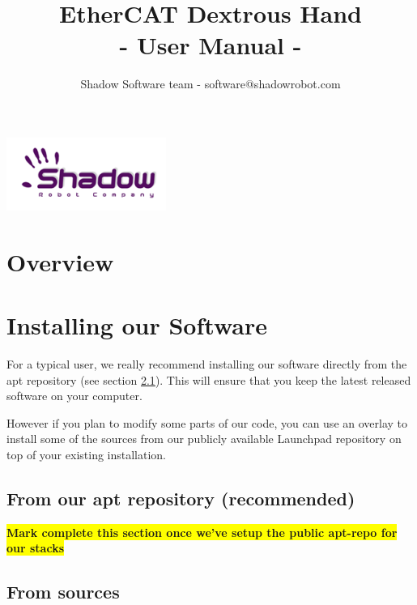 \documentclass[12pt]{article}
\title{\textbf{EtherCAT Dextrous Hand} \\
- User Manual -}
\author{Shadow Software team - software@shadowrobot.com}
\newcommand{\todo}[1]{\colorbox{yellow}{\textbf{#1}}}
\begin{document}
\begin{titlepage}

\maketitle
\vspace{5cm}
\begin{center}
\includegraphics{images/logo-shadowDB.png}
\end{center}
\end{titlepage}

\tableofcontents
\newpage

\section{Overview}
\label{sec:overview}

\newpage

\section{Installing our Software}
\label{sec:install}
\par For a typical user, we really recommend installing our software directly from the apt repository (see section \ref{sec:install_apt}). This will ensure that you keep the latest released software on your computer.

\par However if you plan to modify some parts of our code, you can use an overlay to install some of the sources from our publicly available Launchpad repository on top of your existing installation.

\subsection{From our apt repository (recommended)}
\label{sec:install_apt}
\todo{Mark complete this section once we've setup the public apt-repo for our stacks}


\subsection{From sources}
\label{sec:install_src}
\end{document}

